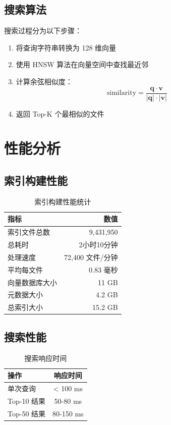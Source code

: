 \documentclass[12pt,a4paper]{article}
\begin{document}
\subsection{搜索算法}

搜索过程分为以下步骤：

\begin{enumerate}
    \item 将查询字符串转换为 128 维向量
    \item 使用 HNSW 算法在向量空间中查找最近邻
    \item 计算余弦相似度：
    \begin{equation}
        \text{similarity} = \frac{\mathbf{q} \cdot \mathbf{v}}{|\mathbf{q}| \cdot |\mathbf{v}|}
    \end{equation}
    \item 返回 Top-K 个最相似的文件
\end{enumerate}

\section{性能分析}

\subsection{索引构建性能}

\begin{table}[h]
\centering
\begin{tabular}{@{}lr@{}}
\toprule
\textbf{指标} & \textbf{数值} \\
\midrule
索引文件总数 & 9,431,950 \\
总耗时 & 2小时10分钟 \\
处理速度 & 72,400 文件/分钟 \\
平均每文件 & 0.83 毫秒 \\
向量数据库大小 & 11 GB \\
元数据大小 & 4.2 GB \\
总索引大小 & 15.2 GB \\
\bottomrule
\end{tabular}
\caption{索引构建性能统计}
\end{table}

\subsection{搜索性能}

\begin{table}[h]
\centering
\begin{tabular}{@{}lc@{}}
\toprule
\textbf{操作} & \textbf{响应时间} \\
\midrule
单次查询 & < 100 ms \\
Top-10 结果 & 50-80 ms \\
Top-50 结果 & 80-150 ms \\
\bottomrule
\end{tabular}
\caption{搜索响应时间}
\end{table}
\end{document}
